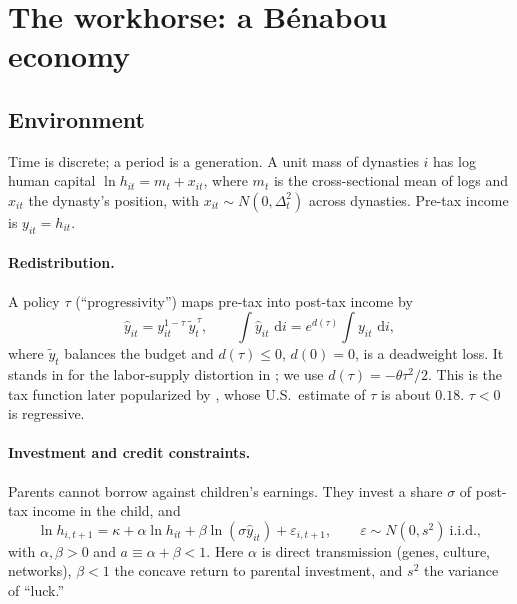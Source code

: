 \documentclass[11pt]{article}
\theoremstyle{remark}
\newcommand{\dd}{\,\mathrm{d}}
\begin{document}
\section{The workhorse: a B\'enabou economy}\label{sec:workhorse}

\subsection{Environment}

Time is discrete; a period is a generation.  A unit mass of dynasties $i$ has log human capital $\ln h_{it}=m_t+x_{it}$, where $m_t$ is the cross-sectional mean of logs and $x_{it}$ the dynasty's position, with $x_{it}\sim N(0,\Delta_t^2)$ across dynasties.  Pre-tax income is $y_{it}=h_{it}$.

\paragraph{Redistribution.}  A policy $\tau$ (``progressivity'') maps pre-tax into post-tax income by
\begin{equation}
\hat y_{it}=y_{it}^{1-\tau}\,\tilde y_t^{\,\tau},
\qquad
\int \hat y_{it}\,\dd i=e^{d(\tau)}\int y_{it}\,\dd i ,
\label{eq:scheme}
\end{equation}
where $\tilde y_t$ balances the budget and $d(\tau)\le 0$, $d(0)=0$, is a deadweight loss.  It stands in for the labor-supply distortion in \citet{Benabou2000}; we use $d(\tau)=-\theta\tau^2/2$.  This is the tax function later popularized by \citet{HeathcoteStoreslettenViolante2017}, whose U.S.\ estimate of $\tau$ is about $0.18$.  $\tau<0$ is regressive.

\paragraph{Investment and credit constraints.}  Parents cannot borrow against children's earnings.  They invest a share $\sigma$ of post-tax income in the child, and
\begin{equation}
\ln h_{i,t+1}=\kappa+\alpha\ln h_{it}+\beta\ln(\sigma\hat y_{it})+\varepsilon_{i,t+1},
\qquad \varepsilon\sim N(0,s^2)\ \text{i.i.d.},
\label{eq:hk}
\end{equation}
with $\alpha,\beta>0$ and $a\equiv\alpha+\beta<1$.  Here $\alpha$ is direct transmission (genes, culture, networks), $\beta<1$ the concave return to parental investment, and $s^2$ the variance of ``luck.''
\end{document}
